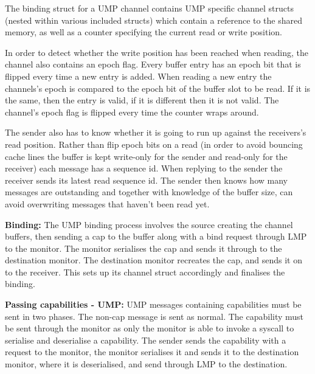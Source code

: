 \documentclass[a4paper,twoside]{report} %
\begin{document}
The binding struct for a UMP channel contains UMP specific channel structs
(nested within various included structs) which contain a reference to the shared
memory, as well as a counter specifying the current read or write position.

In order to detect whether the write position has been reached when reading, the
channel also contains an epoch flag. Every buffer entry has an epoch bit that is
flipped every time a new entry is added. When reading a new entry the channels's
epoch is compared to the epoch bit of the buffer slot to be read. If it is the
same, then the entry is valid, if it is different then it is not valid. The
channel's epoch flag is flipped every time the counter wraps around.

The sender also has to know whether it is going to run up against the
receivers's read position. Rather than flip epoch bits on a read (in order to
avoid bouncing cache lines the buffer is kept write-only for the sender and
read-only for the receiver) each message has a sequence id. When replying to the
sender the receiver sends its latest read sequence id. The sender then knows how
many messages are outstanding and together with knowledge of the buffer size,
can avoid overwriting messages that haven't been read yet.

\textbf{Binding:} The UMP binding process involves the source creating the
channel buffers, then sending a cap to the buffer along with a bind request
through LMP to the monitor. The monitor serialises the cap and sends it through
to the destination monitor. The destination monitor recreates the cap, and sends
it on to the receiver. This sets up its channel struct accordingly and finalises
the binding.

\textbf{Passing capabilities - UMP:} UMP messages containing capabilities must
be sent in two phases. The non-cap message is sent as normal. The capability
must be sent through the monitor as only the monitor is able to invoke a syscall
to serialise and deserialise a capability. The sender sends the capability with
a request to the monitor, the monitor serialises it and sends it to the
destination monitor, where it is deserialised, and send through LMP to the
destination.





\end{document}
